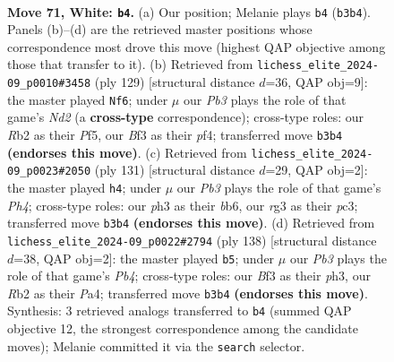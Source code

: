 \documentclass[11pt]{article}
\begin{document}
\clearpage

\begin{figure}[p]\centering
\begin{subfigure}{0.46\textwidth}\centering
\resizebox{\linewidth}{!}{%
\newchessgame
\chessboard[
  setfen={8/B4k2/8/1K3b2/P7/1P3Brp/1R5N/8 w - - 20 71},
  showmover=false,
  pgfstyle=straightmove, color=movearrow, markmove={b3-b4}
]}
\caption{}
\end{subfigure}\hfill
\begin{subfigure}{0.46\textwidth}\centering
\resizebox{\linewidth}{!}{%
\newchessgame
\chessboard[
  setfen={8/3n1k2/3K2p1/5p2/5Pr1/4B3/5R2/8 b - - 3 65},
  showmover=false,
  pgfstyle=straightmove, color=movearrow, markmove={d7-f6}
]}
\caption{}
\end{subfigure}
\\[4pt]
\begin{subfigure}{0.46\textwidth}\centering
\resizebox{\linewidth}{!}{%
\newchessgame
\chessboard[
  setfen={8/8/1BKb1kp1/5n1p/8/2P5/1P1r4/1R6 b - - 17 66},
  showmover=false,
  pgfstyle=straightmove, color=movearrow, markmove={h5-h4}
]}
\caption{}
\end{subfigure}\hfill
\begin{subfigure}{0.46\textwidth}\centering
\resizebox{\linewidth}{!}{%
\newchessgame
\chessboard[
  setfen={k5r1/8/1K5R/2N5/PP2P1b1/7p/8/8 w - - 4 70},
  showmover=false,
  pgfstyle=straightmove, color=movearrow, markmove={b4-b5}
]}
\caption{}
\end{subfigure}
\caption{\textbf{Move 71, White: \texttt{b4}.} (a) Our position; Melanie plays \texttt{b4} (\texttt{b3b4}). Panels (b)--(d) are the retrieved master positions whose correspondence most drove this move (highest QAP objective among those that transfer to it). (b) Retrieved from \texttt{lichess\_elite\_2024-09\_p0010\#3458} (ply 129) [structural distance $d$=36, QAP obj=9]: the master played \texttt{Nf6}; under $\mu$ our \emph{Pb3} plays the role of that game's \emph{Nd2} (a \textbf{cross-type} correspondence); cross-type roles: our \emph{R}b2 as their \emph{P}f5, our \emph{B}f3 as their \emph{p}f4; transferred move \texttt{b3b4} \textbf{(endorses this move)}. (c) Retrieved from \texttt{lichess\_elite\_2024-09\_p0023\#2050} (ply 131) [structural distance $d$=29, QAP obj=2]: the master played \texttt{h4}; under $\mu$ our \emph{Pb3} plays the role of that game's \emph{Ph4}; cross-type roles: our \emph{p}h3 as their \emph{b}b6, our \emph{r}g3 as their \emph{p}c3; transferred move \texttt{b3b4} \textbf{(endorses this move)}. (d) Retrieved from \texttt{lichess\_elite\_2024-09\_p0022\#2794} (ply 138) [structural distance $d$=38, QAP obj=2]: the master played \texttt{b5}; under $\mu$ our \emph{Pb3} plays the role of that game's \emph{Pb4}; cross-type roles: our \emph{B}f3 as their \emph{p}h3, our \emph{R}b2 as their \emph{P}a4; transferred move \texttt{b3b4} \textbf{(endorses this move)}. Synthesis: 3 retrieved analogs transferred to \texttt{b4} (summed QAP objective 12, the strongest correspondence among the candidate moves); Melanie committed it via the \texttt{search} selector.}
\label{fig:thought-m140}
\end{figure}
\end{document}
